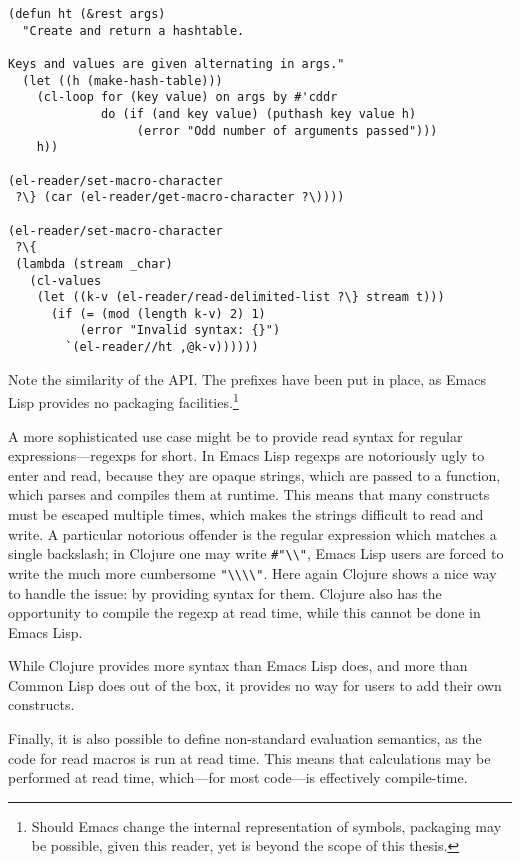\documentclass[a4paper,10pt,twoside]{report}
\newcommand{\el}{Emacs Lisp}
\newcommand{\cl}{Common Lisp}
\newcommand{\elr}{el-reader}
\begin{document}
\begin{lstlisting}[style=lispcode,caption={An equivalent read macro using
  \elr{}.}, label={code:el-hash-reader}]
(defun ht (&rest args)
  "Create and return a hashtable.

Keys and values are given alternating in args."
  (let ((h (make-hash-table)))
    (cl-loop for (key value) on args by #'cddr
             do (if (and key value) (puthash key value h)
                  (error "Odd number of arguments passed")))
    h))

(el-reader/set-macro-character
 ?\} (car (el-reader/get-macro-character ?\))))

(el-reader/set-macro-character
 ?\{
 (lambda (stream _char)
   (cl-values
    (let ((k-v (el-reader/read-delimited-list ?\} stream t)))
      (if (= (mod (length k-v) 2) 1)
          (error "Invalid syntax: {}")
        `(el-reader//ht ,@k-v))))))
\end{lstlisting}

Note the similarity of the API.  The prefixes have been put in place, as \el{}
provides no packaging facilities.\footnote{Should Emacs change the internal
  representation of symbols, packaging may be possible, given this reader, yet
  is beyond the scope of this thesis.}

A more sophisticated use case might be to provide read syntax for regular
expressions---regexps for short.  In \el{} regexps are notoriously ugly to enter
and read, because they are opaque strings, which are passed to a function, which
parses and compiles them at runtime.  This means that many constructs must be
escaped multiple times, which makes the strings difficult to read and write.  A
particular notorious offender is the regular expression which matches a single
backslash; in Clojure one may write \texttt{\#"\textbackslash\textbackslash"},
\el{} users are forced to write the much more cumbersome
\texttt{"\textbackslash\textbackslash\textbackslash\textbackslash"}.  Here again
Clojure shows a nice way to handle the issue: by providing syntax for them.
Clojure also has the opportunity to compile the regexp at read time, while this
cannot be done in \el{}.

While Clojure provides more syntax than \el{} does, and more than \cl{} does out
of the box, it provides no way for users to add their own constructs.

Finally, it is also possible to define non-standard evaluation semantics, as the
code for read macros is run at read time.  This means that calculations may be
performed at read time, which---for most code---is effectively compile-time.
\end{document}
